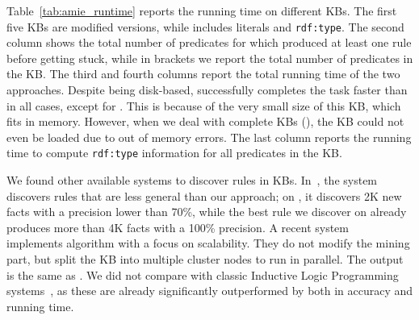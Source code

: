 Table~\ref{tab:amie_runtime} reports the running time on different KBs. The first five KBs are \amie modified versions, while  includes literals and \texttt{rdf:type}. 
The second column shows the total number of predicates for which \amie produced at least one rule before getting stuck, while in brackets we report the total number of predicates in the KB.
%
The third and fourth columns report the total running time of the two approaches. Despite being disk-based, \krd successfully completes the task faster than \amie in all cases, except for . This is because of the very small size of this KB, which fits in 
memory. However, when we deal with complete KBs (), the KB could not even be loaded due to out of memory errors. The last column reports the running time to compute \texttt{rdf:type} information for all predicates in the KB. 

We found other available systems to discover rules in KBs. In~\cite{abedjan2014amending}, the system discovers %
rules that are less general than our approach; on , it discovers 2K new facts with a precision lower than 70\%, while the best rule we discover on  already produces more than 4K facts with a 100\% precision. 
A recent system~\cite{Chen:2016} implements \amie algorithm with a focus on scalability. They do not modify the mining part, but split the KB into multiple cluster nodes to run in parallel. The output is the same as \amie. We did not compare with classic Inductive Logic Programming systems~\cite{dehaspe1999discovery}, as these are already significantly outperformed by \amie both in accuracy and running time.

\vspace{-1ex}

